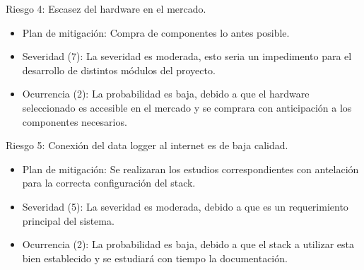 \documentclass[
11pt, %
]{charter}
\begin{document}
Riesgo 4: Escasez del hardware en el mercado.
\begin{itemize}
	\item Plan de mitigación: Compra de componentes lo antes posible.
	\item Severidad (7): La severidad es moderada, esto seria un impedimento para el desarrollo de distintos módulos del proyecto.
	\item Ocurrencia (2): La probabilidad es baja, debido a que el hardware seleccionado es accesible en el mercado y se comprara con anticipación a los componentes necesarios.
\end{itemize}

Riesgo 5: Conexión del data logger al internet es de baja calidad.
\begin{itemize}
	\item Plan de mitigación: Se realizaran los estudios correspondientes con antelación para la correcta configuración del stack.
	\item Severidad (5): La severidad es moderada, debido a que es un requerimiento principal del sistema.
	\item Ocurrencia (2): La probabilidad es baja, debido a que el stack a utilizar esta bien establecido y se estudiará con tiempo la documentación.
\end{itemize}
\end{document}

